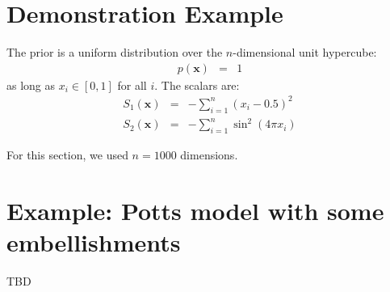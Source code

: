 \documentclass[a4paper, 11pt]{article}
\begin{document}
\section{Demonstration Example}
The prior is a uniform distribution over the $n$-dimensional unit hypercube:
\begin{eqnarray}
p(\mathbf{x}) &=& 1
\end{eqnarray}
as long as $x_i \in [0, 1]$ for all $i$. The scalars are:
\begin{eqnarray}
S_1(\mathbf{x}) &=& -\sum_{i=1}^n \left(x_i - 0.5\right)^2\\
S_2(\mathbf{x}) &=& -\sum_{i=1}^n \sin^2\left(4\pi x_i\right)
\end{eqnarray}

For this section, we used $n=1000$ dimensions.

\section{Example: Potts model with some embellishments}
TBD
\end{document}
